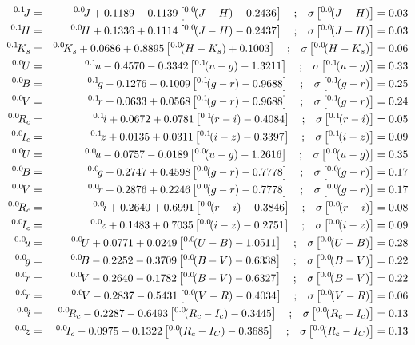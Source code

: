 \documentclass[10pt,preprint]{aastex}
\newcommand{\band}[2]{\ensuremath{^{{#1}}\!{#2}}}
\begin{document}
\begin{eqnarray}
\band{0.1}{J} &=& \band{0.0}{J} + 0.1189 - 0.1139 \left[ \band{0.0}{(J-H)} - 0.2436 \right] \quad \mathrm{;}  \quad \sigma\left[\band{0.0}{(J-H)}\right] = 0.03\cr
\band{0.1}{H} &=& \band{0.0}{H} + 0.1336 + 0.1114 \left[ \band{0.0}{(J-H)} - 0.2437 \right] \quad \mathrm{;}  \quad \sigma\left[\band{0.0}{(J-H)}\right] = 0.03\cr
\band{0.1}{K_s} &=& \band{0.0}{K_s} + 0.0686 + 0.8895 \left[ \band{0.0}{(H-K_s)} + 0.1003 \right] \quad \mathrm{;}  \quad \sigma\left[\band{0.0}{(H-K_s)}\right] = 0.06\cr
\band{0.0}{U} &=& \band{0.1}{u} - 0.4570 - 0.3342 \left[ \band{0.1}{(u-g)} - 1.3211 \right] \quad \mathrm{;}  \quad \sigma\left[\band{0.1}{(u-g)}\right] = 0.33\cr
\band{0.0}{B} &=& \band{0.1}{g} - 0.1276 - 0.1009 \left[ \band{0.1}{(g-r)} - 0.9688 \right] \quad \mathrm{;}  \quad \sigma\left[\band{0.1}{(g-r)}\right] = 0.25\cr
\band{0.0}{V} &=& \band{0.1}{r} + 0.0633 + 0.0568 \left[ \band{0.1}{(g-r)} - 0.9688 \right] \quad \mathrm{;}  \quad \sigma\left[\band{0.1}{(g-r)}\right] = 0.24\cr
\band{0.0}{R_c} &=& \band{0.1}{i} + 0.0672 + 0.0781 \left[ \band{0.1}{(r-i)} - 0.4084 \right] \quad \mathrm{;}  \quad \sigma\left[\band{0.1}{(r-i)}\right] = 0.05\cr
\band{0.0}{I_c} &=& \band{0.1}{z} + 0.0135 + 0.0311 \left[ \band{0.1}{(i-z)} - 0.3397 \right] \quad \mathrm{;}  \quad \sigma\left[\band{0.1}{(i-z)}\right] = 0.09\cr
\band{0.0}{U} &=& \band{0.0}{u} - 0.0757 - 0.0189 \left[ \band{0.0}{(u-g)} - 1.2616 \right] \quad \mathrm{;}  \quad \sigma\left[\band{0.0}{(u-g)}\right] = 0.35\cr
\band{0.0}{B} &=& \band{0.0}{g} + 0.2747 + 0.4598 \left[ \band{0.0}{(g-r)} - 0.7778 \right] \quad \mathrm{;}  \quad \sigma\left[\band{0.0}{(g-r)}\right] = 0.17\cr
\band{0.0}{V} &=& \band{0.0}{r} + 0.2876 + 0.2246 \left[ \band{0.0}{(g-r)} - 0.7778 \right] \quad \mathrm{;}  \quad \sigma\left[\band{0.0}{(g-r)}\right] = 0.17\cr
\band{0.0}{R_c} &=& \band{0.0}{i} + 0.2640 + 0.6991 \left[ \band{0.0}{(r-i)} - 0.3846 \right] \quad \mathrm{;}  \quad \sigma\left[\band{0.0}{(r-i)}\right] = 0.08\cr
\band{0.0}{I_c} &=& \band{0.0}{z} + 0.1483 + 0.7035 \left[ \band{0.0}{(i-z)} - 0.2751 \right] \quad \mathrm{;}  \quad \sigma\left[\band{0.0}{(i-z)}\right] = 0.09\cr
\band{0.0}{u} &=& \band{0.0}{U} + 0.0771 + 0.0249 \left[ \band{0.0}{(U-B)} - 1.0511 \right] \quad \mathrm{;}  \quad \sigma\left[\band{0.0}{(U-B)}\right] = 0.28\cr
\band{0.0}{g} &=& \band{0.0}{B} - 0.2252 - 0.3709 \left[ \band{0.0}{(B-V)} - 0.6338 \right] \quad \mathrm{;}  \quad \sigma\left[\band{0.0}{(B-V)}\right] = 0.22\cr
\band{0.0}{r} &=& \band{0.0}{V} - 0.2640 - 0.1782 \left[ \band{0.0}{(B-V)} - 0.6327 \right] \quad \mathrm{;}  \quad \sigma\left[\band{0.0}{(B-V)}\right] = 0.22\cr
\band{0.0}{r} &=& \band{0.0}{V} - 0.2837 - 0.5431 \left[ \band{0.0}{(V-R)} - 0.4034 \right] \quad \mathrm{;}  \quad \sigma\left[\band{0.0}{(V-R)}\right] = 0.06\cr
\band{0.0}{i} &=& \band{0.0}{R_c} - 0.2287 - 0.6493 \left[ \band{0.0}{(R_c-I_c)} - 0.3445 \right] \quad \mathrm{;}  \quad \sigma\left[\band{0.0}{(R_c-I_c)}\right] = 0.13\cr
\band{0.0}{z} &=& \band{0.0}{I_c} - 0.0975 - 0.1322 \left[ \band{0.0}{(R_c-I_C)} - 0.3685 \right] \quad \mathrm{;}  \quad \sigma\left[\band{0.0}{(R_c-I_C)}\right] = 0.13\cr
\end{eqnarray}
\end{document}
